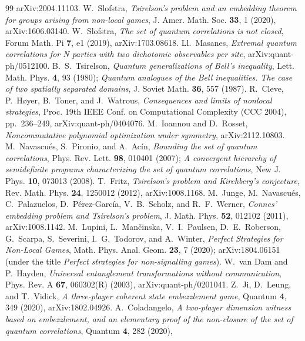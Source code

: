 \documentclass[11pt]{article}
\theoremstyle{remark}
\begin{document}
\begin{thebibliography}{99}
arXiv:2004.11103.
 W.~Slofstra, \emph{Tsirelson's problem and an
embedding theorem for groups arising from non-local games}, J. Amer. Math.
Soc. \textbf{33}, 1 (2020), arXiv:1606.03140.
 W.~Slofstra, \emph{The set of quantum correlations is
not closed}, Forum Math. Pi \textbf{7}, e1 (2019), arXiv:1703.08618.
 Ll.~Masanes, \emph{Extremal quantum correlations for N
parties with two dichotomic observables per site},
arXiv:quant-ph/0512100.
 B.~S.~Tsirelson, \emph{Quantum generalizations of
Bell's inequality}, Lett. Math. Phys. \textbf{4}, 93 (1980); \emph{Quantum
analogues of the Bell inequalities. The case of two spatially separated
domains}, J. Soviet Math. \textbf{36}, 557 (1987).
 R.~Cleve, P.~H{\o}yer, B.~Toner, and J.~Watrous,
\emph{Consequences and limits of nonlocal strategies}, Proc. 19th IEEE
Conf. on Computational Complexity (CCC 2004), pp.~236--249,
arXiv:quant-ph/0404076.
 M.~Ioannou and D.~Rosset, \emph{Noncommutative
polynomial optimization under symmetry}, arXiv:2112.10803.
 M.~Navascu\'es, S.~Pironio, and A.~Ac\'in, \emph{Bounding
the set of quantum correlations}, Phys. Rev. Lett. \textbf{98}, 010401
(2007); \emph{A convergent hierarchy of semidefinite programs
characterizing the set of quantum correlations}, New J. Phys. \textbf{10},
073013 (2008).
 T.~Fritz, \emph{Tsirelson's problem and Kirchberg's
conjecture}, Rev. Math. Phys. \textbf{24}, 1250012 (2012),
arXiv:1008.1168.
 M.~Junge, M.~Navascu\'es, C.~Palazuelos,
D.~P\'erez-Garc\'ia, V.~B.~Scholz, and R.~F.~Werner, \emph{Connes'
embedding problem and Tsirelson's problem}, J. Math. Phys. \textbf{52},
012102 (2011), arXiv:1008.1142.
 M.~Lupini, L.~Man\v{c}inska, V.~I.~Paulsen,
D.~E.~Roberson, G.~Scarpa, S.~Severini, I.~G.~Todorov, and A.~Winter,
\emph{Perfect Strategies for Non-Local Games}, Math. Phys. Anal.
Geom. \textbf{23}, 7 (2020); arXiv:1804.06151 (under the title
\emph{Perfect strategies for non-signalling games}).
 W.~van Dam and P.~Hayden, \emph{Universal
entanglement transformations without communication}, Phys. Rev. A
\textbf{67}, 060302(R) (2003), arXiv:quant-ph/0201041.
 Z.~Ji, D.~Leung, and T.~Vidick, \emph{A three-player
coherent state embezzlement game}, Quantum \textbf{4}, 349 (2020),
arXiv:1802.04926.
 A.~Coladangelo, \emph{A two-player dimension witness
based on embezzlement, and an elementary proof of the non-closure of the
set of quantum correlations}, Quantum \textbf{4}, 282 (2020),

\end{thebibliography}
\end{document}
